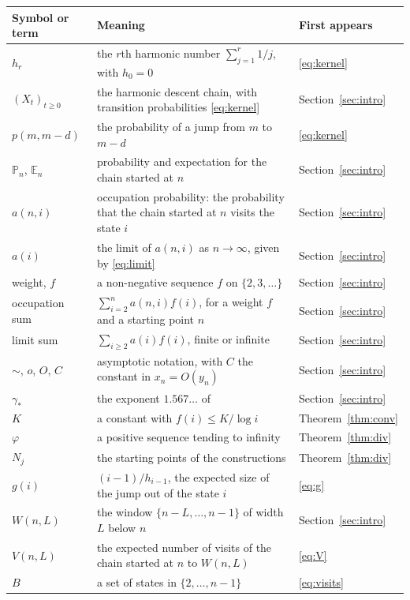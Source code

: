 \documentclass[11pt]{amsart}
\theoremstyle{remark}
\numberwithin{equation}{section}
\newcommand{\E}{\mathbb{E}}
\renewcommand{\P}{\mathbb{P}}
\begin{document}
\begin{longtable}{@{}lp{}p{}@{}}
\toprule
Symbol or term & Meaning & First appears\\
\midrule
\endhead
$h_r$ & the $r$th harmonic number $\sum_{j=1}^{r}1/j$, with $h_0=0$ & \eqref{eq:kernel}\\
$(X_t)_{t\ge0}$ & the harmonic descent chain, with transition probabilities \eqref{eq:kernel} & Section~\ref{sec:intro}\\
$p(m,m-d)$ & the probability of a jump from $m$ to $m-d$ & \eqref{eq:kernel}\\
$\P_n$, $\E_n$ & probability and expectation for the chain started at $n$ & Section~\ref{sec:intro}\\
$a(n,i)$ & occupation probability: the probability that the chain started at $n$ visits the state $i$ & Section~\ref{sec:intro}\\
$a(i)$ & the limit of $a(n,i)$ as $n\to\infty$, given by \eqref{eq:limit} & Section~\ref{sec:intro}\\
weight, $f$ & a non-negative sequence $f$ on $\{2,3,\dots\}$ & Section~\ref{sec:intro}\\
occupation sum & $\sum_{i=2}^{n}a(n,i)f(i)$, for a weight $f$ and a starting point $n$ & Section~\ref{sec:intro}\\
limit sum & $\sum_{i\ge2}a(i)f(i)$, finite or infinite & Section~\ref{sec:intro}\\
$\sim$, $o$, $O$, $C$ & asymptotic notation, with $C$ the constant in $x_n=O(y_n)$ & Section~\ref{sec:intro}\\
$\gamma_*$ & the exponent $1.567\dots$ of \cite{BCM} & Section~\ref{sec:intro}\\
$K$ & a constant with $f(i)\le K/\log i$ & Theorem~\ref{thm:conv}\\
$\varphi$ & a positive sequence tending to infinity & Theorem~\ref{thm:div}\\
$N_j$ & the starting points of the constructions & Theorem~\ref{thm:div}\\
$g(i)$ & $(i-1)/h_{i-1}$, the expected size of the jump out of the state $i$ & \eqref{eq:g}\\
$W(n,L)$ & the window $\{n-L,\dots,n-1\}$ of width $L$ below $n$ & Section~\ref{sec:intro}\\
$V(n,L)$ & the expected number of visits of the chain started at $n$ to $W(n,L)$ & \eqref{eq:V}\\
$B$ & a set of states in $\{2,\dots,n-1\}$ & \eqref{eq:visits}\\

\end{longtable}
\end{document}

